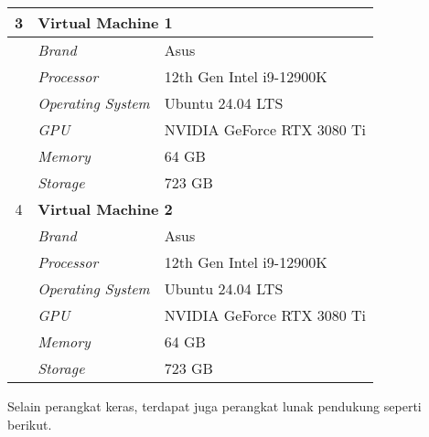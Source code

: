 \begin{table}[H]
\begin{tabularx}{\textwidth}{|c|X|X|}
    3            & \multicolumn{2}{l|}{\textbf{Virtual Machine 1}}                              \\ \hline
             & \textit{Brand}                           & Asus                     \\ \hline
             & \textit{Processor}                       & 12th Gen Intel i9-12900K \\ \hline
             & \textit{Operating System}                & Ubuntu 24.04 LTS                 \\ \hline
             & \textit{GPU}                             & NVIDIA GeForce RTX 3080 Ti \\ \hline
             & \textit{Memory}                          & 64 GB                      \\ \hline
             & \textit{Storage}                         & 723 GB                       \\ \hline
 
    4            & \multicolumn{2}{l|}{\textbf{Virtual Machine 2}}                              \\ \hline
         & \textit{Brand}                           & Asus                     \\ \hline
         & \textit{Processor}                       & 12th Gen Intel i9-12900K \\ \hline
         & \textit{Operating System}                & Ubuntu 24.04 LTS          \\ \hline
         & \textit{GPU}                             & NVIDIA GeForce RTX 3080 Ti \\ \hline
         & \textit{Memory}                          & 64 GB                      \\ \hline
         & \textit{Storage}                         & 723 GB                       \\ \hline

  \end{tabularx}
\end{table}

Selain perangkat keras, terdapat juga perangkat lunak pendukung seperti
berikut.

